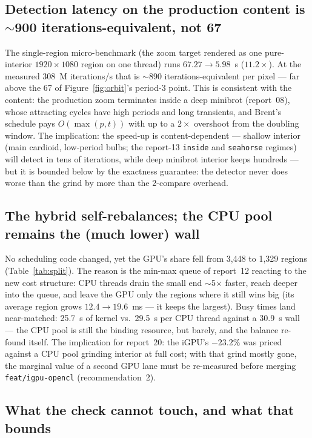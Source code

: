 \documentclass[
	english,
	letterpaper, oneside
]{article}
\begin{document}
\subsection{Detection latency on the production content is $\sim$900 iterations-equivalent, not 67}

The single-region micro-benchmark (the zoom target rendered as one
pure-interior $1920\times1080$ region on one thread) runs $67.27 \to 5.98$~s
($11.2\times$). At the measured 308~M iterations/s that is $\sim$890
iterations-equivalent per pixel --- far above the 67 of
Figure~\ref{fig:orbit}'s period-3 point. This is consistent with the content:
the production zoom terminates inside a deep minibrot (report~08),
whose attracting cycles have high periods and long transients, and Brent's
schedule pays $O(\max(p,t))$ with up to a $2\times$ overshoot from the
doubling window. The implication: the speed-up is content-dependent ---
shallow interior (main cardioid, low-period bulbs; the report-13
\texttt{inside} and \texttt{seahorse} regimes) will detect in tens of
iterations, while deep minibrot interior keeps hundreds --- but it is bounded
below by the exactness guarantee: the detector never does worse than
the grind by more than the 2-compare overhead.

\subsection{The hybrid self-rebalances; the CPU pool remains the (much lower) wall}

No scheduling code changed, yet the GPU's share fell from 3{,}448 to 1{,}329
regions (Table~\ref{tab:split}). The reason is the min-max queue of report~12
reacting to the new cost structure: CPU threads drain the small end
$\sim$5$\times$ faster, reach deeper into the queue, and leave the GPU only
the regions where it still wins big (its average region grows $12.4 \to
19.6$~ms --- it keeps the largest). Busy times land near-matched: 25.7~s of
kernel vs.\ 29.5~s per CPU thread against a 30.9~s wall --- the CPU pool is
still the binding resource, but barely, and the balance re-found itself. The
implication for report~20: the iGPU's $-23.2\%$ was priced against a CPU pool
grinding interior at full cost; with that grind mostly gone, the marginal
value of a second GPU lane must be re-measured before merging
\texttt{feat/igpu-opencl} (recommendation~2).

\subsection{What the check cannot touch, and what that bounds}
\end{document}
